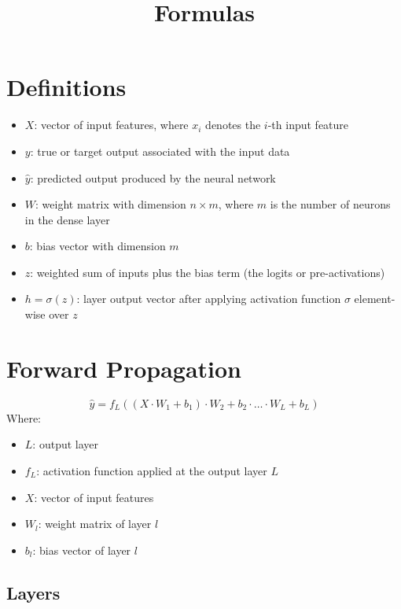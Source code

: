 \documentclass[a4paper]{article}
\title{\vspace{-1in}Formulas}
\author{}
\date{}
\newcommand{\haty}{\hat{y}}
\begin{document}
\maketitle
\vspace{-0.5in}

\section*{Definitions}

\begin{itemize}
\item $X$: vector of input features, where $x_i$ denotes the $i$-th input feature
\item $y$: true or target output associated with the input data
\item $\hat{y}$: predicted output produced by the neural network
\item $W$: weight matrix with dimension $n \times m$, where $m$ is the number of neurons in the dense layer
\item $b$: bias vector with dimension $m$
\item $z$: weighted sum of inputs plus the bias term (the logits or pre-activations)
\item $h=\sigma(z)$: layer output vector after applying activation function $\sigma$ element-wise over $z$
\end{itemize}

\section*{Forward Propagation}

\begin{equation*}
    \haty = f_L((X \cdot W_1+b_1) \cdot W_2 + b_2 \cdot \ldots \cdot W_L + b_L)
\end{equation*}
Where:
\begin{itemize}
    \item $L$: output layer
    \item $f_L$: activation function applied at the output layer $L$
    \item $X$: vector of input features
    \item $W_l$: weight matrix of layer $l$
    \item $b_l$: bias vector of layer $l$
\end{itemize}

\subsection*{Layers}
\end{document}
